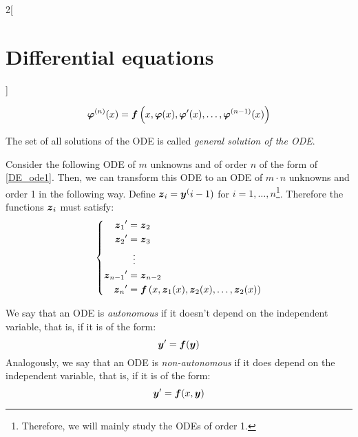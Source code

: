 \documentclass[../../../main.tex]{subfiles}
\begin{document}
\begin{multicols}{2}[\section{Differential equations}]
\begin{definition}
\begin{itemize}
            $$\boldsymbol{\varphi}^{(n)}(x)=\boldsymbol{f}\left(x,\boldsymbol{\varphi}(x),\boldsymbol{\varphi}'(x),\ldots,\boldsymbol{\varphi}^{(n-1)}(x)\right)$$
    \end{itemize}
    The set of all solutions of the ODE is called \textit{general solution of the ODE}.
  \end{definition}
  \begin{prop}
    Consider the following ODE of $m$ unknowns and of order $n$ of the form of \eqref{DE_ode1}. Then, we can transform this ODE to an ODE of $m\cdot n$ unknowns and order 1 in the following way. Define $\boldsymbol{z}_i=\boldsymbol{y}^(i-1)$ for $i=1,\ldots,n$\footnote{Therefore, we will mainly study the ODEs of order 1.}. Therefore the functions $\boldsymbol{z}_i$ must satisfy:
    \begin{equation*}
      \left\{
      \begin{aligned}
        {\boldsymbol{z}_1}'     & =\boldsymbol{z}_2                                                                                            \\
        {\boldsymbol{z}_2}'     & =\boldsymbol{z}_3                                                                                            \\
                                    & \;\;\vdots                                                                                                       \\
        {\boldsymbol{z}_{n-1}}' & =\boldsymbol{z}_{n-2}                                                                                        \\
        {\boldsymbol{z}_n}'     & =\boldsymbol{f}\left(x,\boldsymbol{z}_1(x),\boldsymbol{z}_2(x),\ldots,\boldsymbol{z}_2(x)\right) \\
      \end{aligned}
      \right.
    \end{equation*}
  \end{prop}
  \begin{definition}
    We say that an ODE is \textit{autonomous} if it doesn't depend on the independent variable, that is, if it is of the form: $$\boldsymbol{y}'=\boldsymbol{f}(\boldsymbol{y})$$ Analogously, we say that an ODE is \textit{non-autonomous} if it does depend on the independent variable, that is, if it is of the form: $$\boldsymbol{y}'=\boldsymbol{f}(x,\boldsymbol{y})$$
  \end{definition}

\end{multicols}
\end{document}
